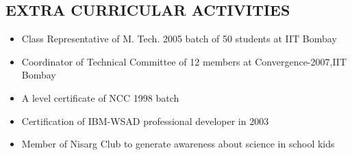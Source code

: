 \documentclass{res}
\begin{document}
\begin{resume}
\section{EXTRA CURRICULAR ACTIVITIES}
\begin{itemize}
\item Class Representative of M. Tech. 2005 batch of 50 students at IIT Bombay
\item Coordinator of Technical Committee of 12 members at Convergence-2007,IIT Bombay
\item A level certificate of NCC 1998 batch
\item Certification of IBM-WSAD professional developer in 2003
\item Member of Nisarg Club to generate awareness about science in school kids
\end{itemize}

					  \end{resume} 
					  
\end{document}
